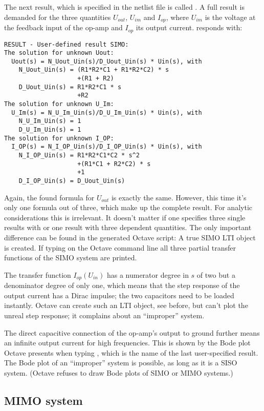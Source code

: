 The next result, which is specified in the netlist file is called
. A full result is demanded for the three quantities
$U_{out}$, $U_{im}$ and $I_{op}$, where $U_{im}$ is the voltage at the
feedback input of the op-amp and $I_{op}$ its output current. \linnet{}
responds with:
\begin{verbatim}
RESULT - User-defined result SIMO:
The solution for unknown Uout:
  Uout(s) = N_Uout_Uin(s)/D_Uout_Uin(s) * Uin(s), with
    N_Uout_Uin(s) = (R1*R2*C1 + R1*R2*C2) * s
                    +(R1 + R2)
    D_Uout_Uin(s) = R1*R2*C1 * s
                    +R2
The solution for unknown U_Im:
  U_Im(s) = N_U_Im_Uin(s)/D_U_Im_Uin(s) * Uin(s), with
    N_U_Im_Uin(s) = 1
    D_U_Im_Uin(s) = 1
The solution for unknown I_OP:
  I_OP(s) = N_I_OP_Uin(s)/D_I_OP_Uin(s) * Uin(s), with
    N_I_OP_Uin(s) = R1*R2*C1*C2 * s^2
                    +(R1*C1 + R2*C2) * s
                    +1
    D_I_OP_Uin(s) = D_Uout_Uin(s)
\end{verbatim}

Again, the found formula for $U_{out}$ is exactly the same. However, this
time it's only one formula out of three, which make up the complete
result. For analytic considerations this is irrelevant. It doesn't matter
if one specifies three single results with  or one result with
three dependent quantities. The only important difference can be found in
the generated Octave script: A true SIMO LTI object is created. If typing
 on the Octave command line all three partial transfer
functions of the SIMO system are printed.

The transfer function $I_{op}(U_{in})$ has a numerator degree in $s$ of
two but a denominator degree of only one, which means that the step
response of the output current has a Dirac impulse; the two capacitors
need to be loaded instantly. Octave can create such an LTI object, see
before, but can't plot the unreal step response; it complains about an
``improper'' system.

The direct capacitive connection of the op-amp's output to ground further
means an infinite output current for high frequencies. This is shown by
the Bode plot Octave presents when typing , which is the name of
the last user-specified result. The Bode plot of an ``improper'' system
is possible, as long as it is a SISO system. (Octave refuses to draw Bode
plots of SIMO or MIMO systems.)


\subsection{MIMO system}

